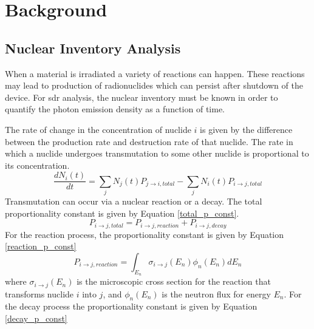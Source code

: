 \section{Background}


\subsection{Nuclear Inventory Analysis}
When a material is irradiated a variety of reactions can happen. These 
reactions may lead to production of radionuclides which can persist
after shutdown of the device. For \gls{sdr} analysis, 
the nuclear inventory must be known
in order to quantify the photon emission density as a function of time.

The rate of change in the concentration of nuclide $i$ is given by the 
difference between the production rate and destruction rate of that nuclide.
The rate in which a nuclide undergoes transmutation to some other nuclide
is proportional to its concentration. 
\begin{equation}\label{rate_change_i}
  \frac{dN_{i}(t)}{dt} = \sum_{j} N_{j}(t)P_{j \rightarrow i, total}
  - \sum_{j} N_{i}(t)P_{i \rightarrow j, total}
\end{equation}
Transmutation can occur via a nuclear reaction or a decay. The total
proportionality constant is given by Equation \ref{total_p_const}.
\begin{equation}\label{total_p_const}
  P_{i \rightarrow j, total} = P_{i \rightarrow j, reaction } +
  P_{i \rightarrow j, decay}
\end{equation}
For the reaction process, the proportionality constant is given by
Equation \ref{reaction_p_const}
\begin{equation}\label{reaction_p_const}
  P_{i \rightarrow j, reaction } =
  \int_{E_{n}} \sigma_{i \rightarrow j}(E_{n})
  \phi_{n}(E_n)dE_{n}
\end{equation}
where $\sigma_{i \rightarrow j}(E_{n})$ is the microscopic cross
section for the reaction that transforms nuclide $i$ into $j$, and
 $\phi_{n}(E_{n})$ is the neutron flux for energy $E_{n}$.
For the decay process the proportionality constant is given by Equation
\ref{decay_p_const}

